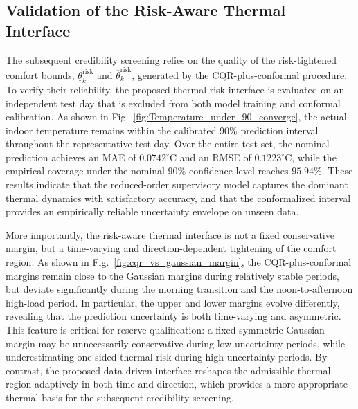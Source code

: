 \documentclass[journal]{IEEEtran}
\theoremstyle{remark}
\begin{document}
	
	\subsection{Validation of the Risk-Aware Thermal Interface}
	\label{subsec:validation_risk_interface}
	
	The subsequent credibility screening relies on the quality of the risk-tightened comfort bounds, $\underline{\theta}_k^{\mathrm{risk}}$ and $\overline{\theta}_k^{\mathrm{risk}}$, generated by the CQR-plus-conformal procedure. To verify their reliability, the proposed thermal risk interface is evaluated on an independent test day that is excluded from both model training and conformal calibration. As shown in Fig.~\ref{fig:Temperature_under_90_converge}, the actual indoor temperature remains within the calibrated 90\% prediction interval throughout the representative test day. Over the entire test set, the nominal prediction achieves an MAE of $0.0742^\circ\mathrm{C}$ and an RMSE of $0.1223^\circ\mathrm{C}$, while the empirical coverage under the nominal 90\% confidence level reaches $95.94\%$. These results indicate that the reduced-order supervisory model captures the dominant thermal dynamics with satisfactory accuracy, and that the conformalized interval provides an empirically reliable uncertainty envelope on unseen data.
	
	More importantly, the risk-aware thermal interface is not a fixed conservative margin, but a time-varying and direction-dependent tightening of the comfort region. As shown in Fig.~\ref{fig:cqr_vs_gaussian_margin}, the CQR-plus-conformal margins remain close to the Gaussian margins during relatively stable periods, but deviate significantly during the morning transition and the noon-to-afternoon high-load period. In particular, the upper and lower margins evolve differently, revealing that the prediction uncertainty is both time-varying and asymmetric. This feature is critical for reserve qualification: a fixed symmetric Gaussian margin may be unnecessarily conservative during low-uncertainty periods, while underestimating one-sided thermal risk during high-uncertainty periods. By contrast, the proposed data-driven interface reshapes the admissible thermal region adaptively in both time and direction, which provides a more appropriate thermal basis for the subsequent credibility screening.
	
\end{document}
